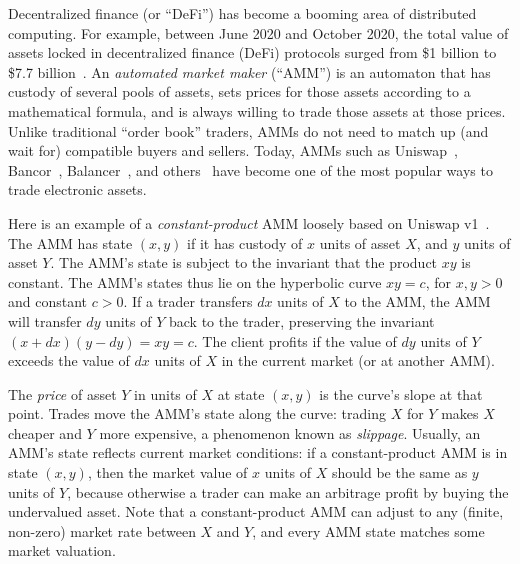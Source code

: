 Decentralized finance (or ``DeFi'') has become a booming area of
distributed computing.
For example, between June 2020 and October 2020,
the total value of assets locked in decentralized finance (DeFi) protocols
surged from \$1 billion to \$7.7 billion~\cite{defipulse}.
An \emph{automated market maker} (``AMM'') is an automaton that has
custody of several pools of assets,
sets prices for those assets according to a mathematical formula,
and is always willing to trade those assets at those prices.
Unlike traditional ``order book'' traders,
AMMs do not need to match up (and wait for) compatible buyers and sellers.
Today, AMMs such as Uniswap~\cite{uniswap}, Bancor~\cite{bancor}, Balancer~\cite{balancer},
and others~\cite{pourpouneh} have become one of the most popular ways to trade electronic assets.

Here is an example of a \emph{constant-product} AMM
loosely based on Uniswap v1~\cite{uniswap}.
The AMM has state $(x,y)$ if it has custody of $x$ units of asset $X$,
and $y$ units of asset $Y$.
The AMM's state is subject to the invariant that the product $xy$ is
constant.
The AMM's states thus lie on the hyperbolic curve $x y = c$, 
for $x,y > 0$ and constant $c > 0$.
If a trader transfers $dx$ units of $X$ to the AMM, 
the AMM will transfer $dy$ units of $Y$ back to the trader,
preserving the invariant $(x+dx) (y - dy) = x y = c$.
The client profits if the value of $dy$ units of $Y$ exceeds
the value of $dx$ units of $X$ in the current market (or at another AMM).

The \emph{price} of asset $Y$ in units of $X$ at state $(x,y)$
is the curve's slope at that point.
Trades move the AMM's state along the curve:
trading $X$ for $Y$ makes $X$ cheaper and $Y$ more expensive,
a phenomenon known as \emph{slippage}.
Usually, an AMM's state reflects current market conditions:
if a constant-product AMM is in state $(x,y)$,
then the market value of $x$ units of $X$ should be the same as $y$ units of $Y$,
because otherwise a trader can make an arbitrage profit by buying
the undervalued asset.
Note that a constant-product AMM can adjust to any
(finite, non-zero)
market rate between $X$ and $Y$,
and every AMM state matches some market valuation.

